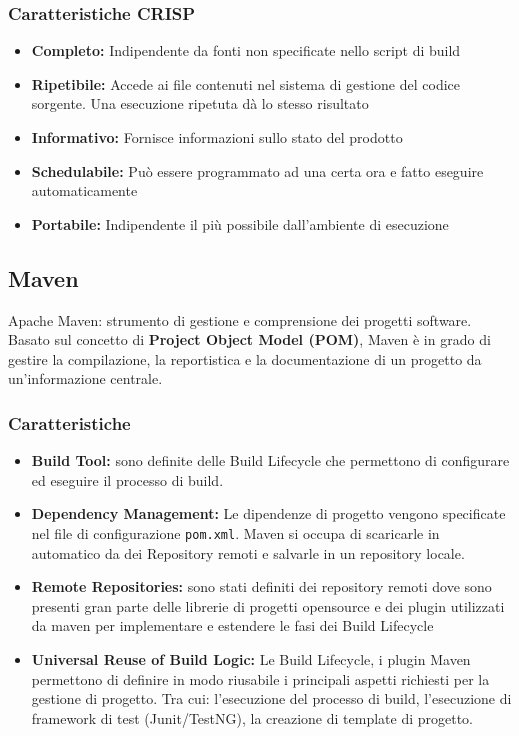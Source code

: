 \subsubsection{Caratteristiche CRISP}
\begin{itemize}
    \item \textbf{Completo:} Indipendente da fonti non specificate nello script di build
    \item \textbf{Ripetibile:} Accede ai file contenuti nel sistema di gestione del codice sorgente. Una esecuzione ripetuta dà lo stesso risultato
    \item \textbf{Informativo:} Fornisce informazioni sullo stato del prodotto
    \item \textbf{Schedulabile:} Può essere programmato ad una certa ora e fatto eseguire automaticamente
    \item \textbf{Portabile:} Indipendente il più possibile dall'ambiente di esecuzione
\end{itemize}

\newpage
\subsection{Maven}
\begin{mdframed}
    Apache Maven: strumento di gestione e comprensione dei progetti software. Basato sul concetto di \textbf{Project Object Model (POM)}, Maven è in grado di gestire la compilazione, la reportistica e la documentazione di un progetto da un'informazione centrale.
\end{mdframed}

\subsubsection{Caratteristiche}
\begin{itemize}
    \item \textbf{Build Tool:} sono definite delle Build Lifecycle che permettono di configurare ed eseguire il processo di build.
    \item \textbf{Dependency Management:} Le dipendenze di progetto vengono specificate nel file di configurazione \verb|pom.xml|. Maven si occupa di scaricarle in automatico da dei Repository remoti e salvarle in un repository locale.
    \item \textbf{Remote Repositories:} sono stati definiti dei repository remoti dove sono presenti gran parte delle librerie di progetti opensource e dei plugin utilizzati da maven per implementare e estendere le fasi dei Build Lifecycle
    \item \textbf{Universal Reuse of Build Logic:} Le Build Lifecycle, i plugin Maven permettono di definire in modo riusabile i principali aspetti richiesti per la gestione di progetto. Tra cui: l'esecuzione del processo di build, l'esecuzione di framework di test (Junit/TestNG), la creazione di template di progetto.
\end{itemize}

